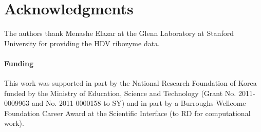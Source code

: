 \documentclass[letter]{bioinfo}
\begin{document}
\section*{Acknowledgments}
The authors thank Menashe Elazar at the Glenn Laboratory at Stanford University for providing the HDV ribozyme data.

\paragraph{Funding\textcolon}
This work was supported in part by the National Research Foundation of Korea funded by the Ministry of Education, Science and Technology (Grant No. 2011-0009963 and No. 2011-0000158 to SY) and in part by a Burroughs-Wellcome Foundation Career Award at the Scientific Interface (to RD for computational work).



%
%

\end{document}
